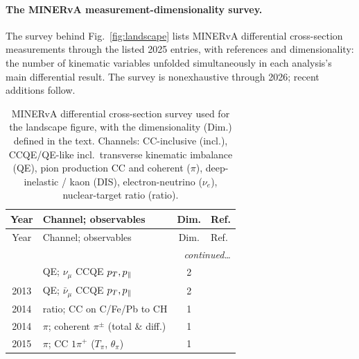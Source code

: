 \paragraph{The MINERvA measurement-dimensionality survey.}
\label{app:landscape}
The survey behind Fig.~\ref{fig:landscape} lists MINERvA differential cross-section measurements through the listed 2025 entries, with references and dimensionality: the number of kinematic variables unfolded simultaneously in each analysis's main differential result. The survey is nonexhaustive through 2026; recent additions follow. {\small
\begin{longtable}{@{}clcl@{}}
  \caption{MINERvA differential cross-section survey used for the landscape figure, with the dimensionality
  (Dim.) defined in the text. Channels: CC-inclusive (incl.),
  CCQE/QE-like incl.\ transverse kinematic imbalance (QE), pion production CC
  and coherent ($\pi$), deep-inelastic / kaon (DIS), electron-neutrino
  ($\nu_e$), nuclear-target ratio (ratio).}
  \label{tab:landscape}\\
  \toprule
  Year & Channel; observables & Dim. & Ref. \\
  \midrule
  \endfirsthead
  \toprule
  Year & Channel; observables & Dim. & Ref. \\
  \midrule
  \endhead
  \midrule \multicolumn{4}{r}{\emph{continued\ldots}}\\ \endfoot
  \bottomrule
  \endlastfoot
  2013 & QE; $\nu_\mu$ CCQE $p_{T},p_{\parallel}$            & 2 & \cite{MINERvA:2013qe} \\
  2013 & QE; $\bar\nu_\mu$ CCQE $p_{T},p_{\parallel}$        & 2 & \cite{MINERvA:2013qebar} \\
  2014 & ratio; CC on C/Fe/Pb to CH               & 1 & \cite{MINERvA:2014ratio} \\
  2014 & $\pi$; coherent $\pi^\pm$ (total \& diff.) & 1 & \cite{MINERvA:2014coh} \\
  2015 & $\pi$; CC $1\pi^+$ ($T_\pi$, $\theta_\pi$) & 1 & \cite{MINERvA:2015ydy} \\

\end{longtable}}
